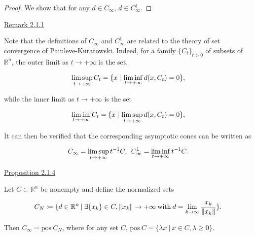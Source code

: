 \documentclass[a4paper,11pt]{jsarticle}
\newcommand{\PROPOSITION}[2]{\begin{itembox}[l]{\underline{Proposition {#1} }}{#2}\end{itembox}}
\newcommand{\REMARK}[2]{\begin{itembox}[l]{\underline{Remark {#1} }}{#2}\end{itembox}}
\newcommand{\NDemenstionalRealEuclidianSpace}{\mathbb{R}^n}
\begin{document}
\begin{proof}
  We show that for any $d \in C_{\infty}$, $d \in C_{\infty}^1$.
\end{proof}

\REMARK{2.1.1}{
  Note that the definitions of $C_{\infty}$ and $C_{\infty}^1$ are related to the theory of set convergence of Painleve-Kuratowski. Indeed, for a family $\{C_t\}_{t>0}$ of subsets of $\NDemenstionalRealEuclidianSpace$, the outer limit as $t \rightarrow + \infty$ is the set.

  \begin{equation}
    \limsup_{t \to +\infty} C_t = \{x \:|\: \liminf_{t \to +\infty} d(x, C_t) = 0\}, \notag
  \end{equation}

  while the inner limit as $t \rightarrow +\infty$ is the set

  \begin{equation}
    \liminf_{t \to +\infty} C_t = \{x \:|\: \limsup_{t \to +\infty} d(x, C_t) = 0\}, \notag
  \end{equation}

  It can then be verified that the corresponding asymptotic cones can be written as

  \begin{equation}
    C_{\infty} = \limsup_{t \to +\infty} t^{-1} C,\:\: C_{\infty}^1  = \liminf_{t \to +\infty} t^{-1} C. \notag
  \end{equation}
}

\PROPOSITION{2.1.4}{
  Let $C \subset \NDemenstionalRealEuclidianSpace$ be nonempty and define the normalized sets

  \begin{equation}
    C_N \coloneqq \{d \in \NDemenstionalRealEuclidianSpace \:|\: \exists \{x_k\} \in C, \left\lVert x_k \right\rVert \rightarrow +\infty \:\text{with}\: d = \lim_{k \to \infty} \frac{x_k}{\left\lVert x_k \right\rVert }\}. \notag
  \end{equation}

  Then $C_{\infty} = \text{pos}\:C_N$, where for any set $C$, $\text{pos}\:C = \{\lambda x \:|\: x \in C, \lambda \geq 0\}$.

}
\end{document}
